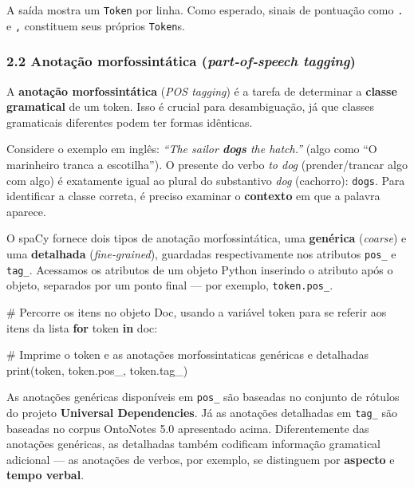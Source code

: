 \documentclass[
  brazilian,
  11pt,
]{article}
\newenvironment{Shaded}{\begin{snugshade}}{\end{snugshade}}
\newcommand{\BuiltInTok}[1]{\textcolor[rgb]{0.50,0.55,0.55}{#1}}
\newcommand{\CommentTok}[1]{\textcolor[rgb]{0.48,0.49,0.49}{#1}}
\newcommand{\ControlFlowTok}[1]{\textcolor[rgb]{0.99,0.74,0.29}{\textbf{#1}}}
\newcommand{\KeywordTok}[1]{\textcolor[rgb]{0.81,0.81,0.76}{\textbf{#1}}}
\newcommand{\NormalTok}[1]{\textcolor[rgb]{0.81,0.81,0.76}{#1}}
\let\oldtexttt\texttt
\renewcommand{\texttt}[1]{{\color{inlink}\oldtexttt{#1}}}
\begin{document}
A saída mostra um \texttt{Token} por linha. Como esperado, sinais de
pontuação como \texttt{.} e \texttt{,} constituem seus próprios
\texttt{Token}s.

\subsubsection{\texorpdfstring{2.2 Anotação morfossintática
(\emph{part‑of‑speech
tagging})}{2.2 Anotação morfossintática (part‑of‑speech tagging)}}\label{anotauxe7uxe3o-morfossintuxe1tica-partofspeech-tagging}

A \textbf{anotação morfossintática} (\emph{POS tagging}) é a tarefa de
determinar a \textbf{classe gramatical} de um token. Isso é crucial para
desambiguação, já que classes gramaticais diferentes podem ter formas
idênticas.

Considere o exemplo em inglês: \emph{``The sailor \textbf{dogs} the
hatch.''} (algo como ``O marinheiro tranca a escotilha''). O presente do
verbo \emph{to dog} (prender/trancar algo com algo) é exatamente igual
ao plural do substantivo \emph{dog} (cachorro): \texttt{dogs}. Para
identificar a classe correta, é preciso examinar o \textbf{contexto} em
que a palavra aparece.

O spaCy fornece dois tipos de anotação morfossintática, uma
\textbf{genérica} (\emph{coarse}) e uma \textbf{detalhada}
(\emph{fine‑grained}), guardadas respectivamente nos atributos
\texttt{pos\_} e \texttt{tag\_}. Acessamos os atributos de um objeto
Python inserindo o atributo após o objeto, separados por um ponto final
--- por exemplo, \texttt{token.pos\_}.

\begin{Shaded}
\begin{Highlighting}[]
\CommentTok{\# Percorre os itens no objeto Doc, usando a variável \textquotesingle{}token\textquotesingle{} para se referir aos itens da lista}
\ControlFlowTok{for}\NormalTok{ token }\KeywordTok{in}\NormalTok{ doc:}

    \CommentTok{\# Imprime o token e as anotações morfossintaticas genéricas e detalhadas}
    \BuiltInTok{print}\NormalTok{(token, token.pos\_, token.tag\_)}
\end{Highlighting}
\end{Shaded}

As anotações genéricas disponíveis em \texttt{pos\_} são baseadas no
conjunto de rótulos do projeto \textbf{Universal Dependencies}. Já as
anotações detalhadas em \texttt{tag\_} são baseadas no corpus OntoNotes
5.0 apresentado acima. Diferentemente das anotações genéricas, as
detalhadas também codificam informação gramatical adicional --- as
anotações de verbos, por exemplo, se distinguem por \textbf{aspecto} e
\textbf{tempo verbal}.
\end{document}
